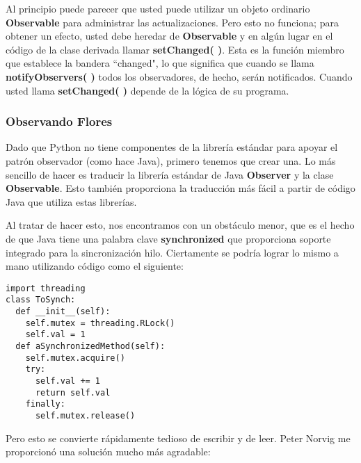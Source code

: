 Al principio puede parecer que usted puede utilizar un objeto ordinario \textbf{Observable} para administrar las actualizaciones. Pero esto no funciona; para obtener un efecto, usted debe heredar de \textbf{Observable} y en algún lugar en el código de la clase derivada llamar \textbf{setChanged( )}. Esta es la función miembro que establece la bandera “changed", lo que significa que cuando se llama \textbf{notifyObservers( )} todos los observadores, de hecho, serán notificados. Cuando usted llama \textbf{setChanged( )} depende de la lógica de su programa.
 
\newpage

\subsubsection*{Observando Flores}
\label{subsubsec:of}


Dado que Python  no tiene componentes de la  librería estándar para apoyar el patrón observador (como hace Java), primero tenemos que crear una. Lo más sencillo de hacer es traducir la librería estándar de Java \textbf{Observer} y la clase \textbf{Observable}. Esto también proporciona la traducción más fácil a partir de código Java que utiliza estas librerías.    \newline

Al tratar de hacer esto, nos encontramos con un obstáculo menor, que es el hecho de que Java tiene una palabra clave \textbf{synchronized} que proporciona soporte integrado para la sincronización hilo. Ciertamente se podría lograr lo mismo a mano utilizando código como el siguiente:\newline

\begin{lstlisting} 
import threading  
class ToSynch: 
  def __init__(self): 
    self.mutex = threading.RLock() 
    self.val = 1 
  def aSynchronizedMethod(self): 
    self.mutex.acquire() 
    try: 
      self.val += 1 
      return self.val 
    finally: 
      self.mutex.release() 
\end{lstlisting}

 Pero esto se convierte rápidamente tedioso de escribir y de leer.  Peter Norvig me proporcionó una solución mucho más agradable:     \newline
 
